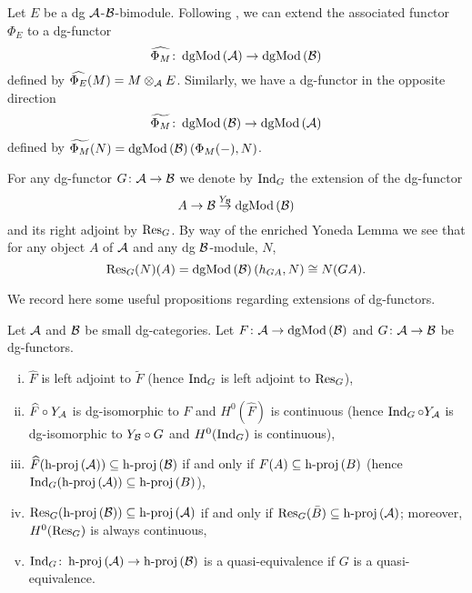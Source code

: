 Let \(E\) be a dg \(\A\)-\(\B\)-bimodule.
Following \textcite[Section 3]{CS15}, we can extend the associated functor \(\Phi_E\) to a dg-functor
\[\widehat{\Phi_M} \colon \dgMod{\A} \to \dgMod{\B}\]
defined by \(\widehat{\Phi_E}(M) = M \otimes_\A E\).
Similarly, we have a dg-functor in the opposite direction
\[\widetilde{\Phi_M} \colon \dgMod{\B} \to \dgMod{\A}\]
defined by \(\widetilde{\Phi_M}(N) = \dgMod{\B}(\Phi_M( - ), N)\).

For any dg-functor \(G \colon \A \to \B\) we denote by \(\Ind{G}\) the extension of the dg-functor
\[A \to \B \overset{Y_\B}\to \dgMod{\B}\]
and its right adjoint by \(\Res{G}\).
By way of the enriched Yoneda Lemma we see that for any object \(A\) of \(\A\) and any dg \(\B\)-module, \(N\), 
\[\Res{G}(N)(A) = \dgMod{\B}(h_{GA}, N) \cong N(GA).\]

We record here some useful propositions regarding extensions of dg-functors.

\begin{proposition}[{\textcite[Prop 3.2]{CS15}}]
  Let \(\A\) and \(\B\) be small dg-categories.
  Let \(F \colon \A \to \dgMod{\B}\) and \(G \colon \A \to \B\) be dg-functors.
  \begin{enumerate}[(i)]
  \item
    \(\widehat{F}\) is left adjoint to \(\widetilde{F}\) (hence \(\Ind{G}\) is left adjoint to \(\Res{G}\)),
  \item
    \(\widehat{F} \circ Y_\A\) is dg-isomorphic to \(F\) and \(H^0(\widehat{F})\) is continuous (hence \(\Ind{G} \circ Y_\A\) is dg-isomorphic to \(Y_\B \circ G\) and \(H^0(\Ind{G})\) is continuous),
  \item
    \(\widehat{F}(\hproj{\A}) \subseteq \hproj{\B}\) if and only if \(F(A) \subseteq \hproj{B}\) (hence \(\Ind{G}(\hproj{\A}) \subseteq \hproj{B}\)),
  \item
    \(\Res{G}(\hproj{\B}) \subseteq \hproj{\A}\) if and only if \(\Res{G}(\bar{B}) \subseteq \hproj{\A}\); moreover,\\ \(H^0(\Res{G})\) is always continuous,
  \item
    \(\Ind{G} \colon \hproj{\A} \to \hproj{\B}\) is a quasi-equivalence if \(G\) is a quasi-equivalence.
  \end{enumerate}
\end{proposition}

